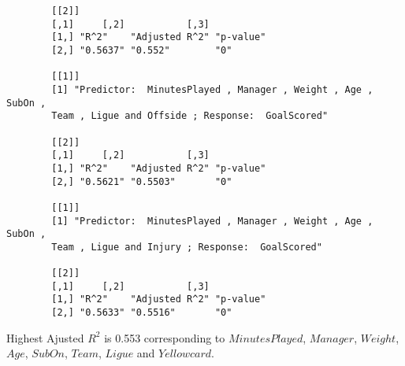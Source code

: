 \documentclass[12pt]{article}
\begin{document}
\begin{verbatim}
		[[2]]
		[,1]     [,2]           [,3]     
		[1,] "R^2"    "Adjusted R^2" "p-value"
		[2,] "0.5637" "0.552"        "0"      
		
		[[1]]
		[1] "Predictor:  MinutesPlayed , Manager , Weight , Age , SubOn , 
		Team , Ligue and Offside ; Response:  GoalScored"
		
		[[2]]
		[,1]     [,2]           [,3]     
		[1,] "R^2"    "Adjusted R^2" "p-value"
		[2,] "0.5621" "0.5503"       "0"      
		
		[[1]]
		[1] "Predictor:  MinutesPlayed , Manager , Weight , Age , SubOn , 
		Team , Ligue and Injury ; Response:  GoalScored"
		
		[[2]]
		[,1]     [,2]           [,3]     
		[1,] "R^2"    "Adjusted R^2" "p-value"
		[2,] "0.5633" "0.5516"       "0"      
	\end{verbatim}
	
	Highest Ajusted $ R^2 $ is 0.553 corresponding to $ MinutesPlayed $, $ Manager $, $ Weight $, $ Age $, $ SubOn $, $ Team $, $ Ligue $ and $ Yellowcard $.
	
\end{document}
